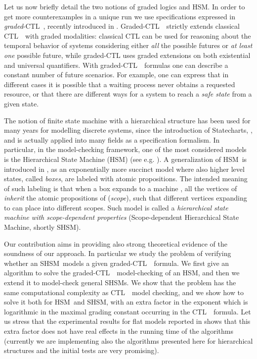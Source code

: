 \documentclass[letterpaper,twocolumn,10pt]{article}
\def    \ctl        {\mbox{\textsc{CTL }\xspace}}
\def    \CTL        {\mbox{\textsc{CTL }\xspace}}
\newcommand{\VHSM}{SHSM}
\newcommand{\HSM}{HSM}
\begin{document}
Let us now briefly detail the two notions of graded logics and HSM.
In order to get more counterexamples in a unique run we use
specifications expressed in {\em graded}-\CTL, recently introduced in \cite{FNP08}.
Graded-\CTL\ strictly extends classical \CTL\ with graded modalities: classical CTL can be used for reasoning
about the temporal behavior of systems con\-si\-de\-ring either {\em all} the possible futures
or {\em at least one} possible future, while graded-CTL uses graded extensions on
both exi\-stential and universal quantifiers.
With graded-\CTL\ formulas one can describe a constant number of future scenarios. For example,
one can express that in  different cases it is possible that a waiting process never
obtains a requested resource, or that there are  different ways for a system to reach a
{\em safe state} from a given state.

The notion of finite state machine with a hierarchical structure
has been used for many years for modelling discrete systems,
since the introduction of Statecharts, \cite{H87}, and is actually
applied into many fields as a specification formalism.
In particular, in the  model-checking framework, one of the most considered models is the Hierarchical State Machine (\HSM)
 (see e.g. \cite{AY01}).
A generalization of \HSM\ is introduced
in \cite{LNPP08}, as an exponentially more succinct model  where also higher level states, called {\em boxes},  are labeled with atomic propositions.
The intended meaning of such labeling is that when a box 
expands to a machine , all the vertices of  \emph{inherit} the
atomic propositions of  (\emph{scope}), such that different
vertices expanding to  can place  into different scopes.
Such model is called a \emph{hierarchical state machine
with scope-dependent properties} (Scope-dependent Hierarchical State Machine, shortly \VHSM).


Our contribution aims in providing also strong theoretical evidence of
the soundness of our approach.
In particular we study the problem of verifying whether an \VHSM\ models a given graded-\ctl\ formula.
We first give an algorithm to solve the graded-\ctl\ model-checking  of an \HSM, and then
we extend it to model-check general \VHSM s.
We show that the problem has the same computational complexity as
 \ctl\ model checking, and we show how to solve it both for  \HSM\ and  \VHSM, with an extra factor in the exponent which is
logarithmic in the maximal grading constant occurring in the \CTL\ formula.
Let us stress that the experimental results for flat models reported in \cite{FMNPS10} shows that
 this  extra factor does not have real effects in the running time of the algorithms
(currently we are implementing also the algorithms presented here for
hierarchical structures and the initial tests are very promising).
\end{document}
